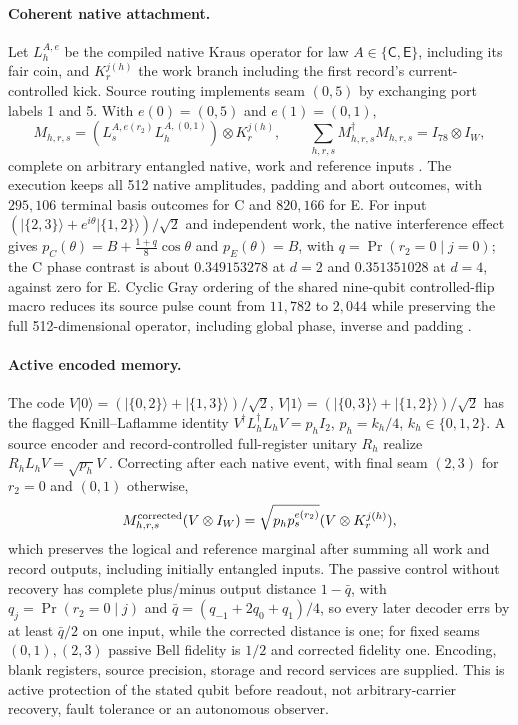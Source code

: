 \documentclass[11pt]{article}
\theoremstyle{definition}
\theoremstyle{remark}
\theoremstyle{plain}
\newcommand{\ket}[1]{\lvert #1\rangle}
\newcommand{\Cn}{\mathsf{C}}
\newcommand{\En}{\mathsf{E}}
\begin{document}
\paragraph{Coherent native attachment.}
Let $L_h^{A,e}$ be the compiled native Kraus operator for law $A\in\{\Cn,\En\}$,
including its fair coin, and $K_r^{j(h)}$ the work branch including the first
record's current-controlled kick. Source routing implements seam $(0,5)$ by
exchanging port labels 1 and 5. With $e(0)=(0,5)$ and $e(1)=(0,1)$,
\[
 M_{h,r,s}=(L_s^{A,e(r_2)}L_h^{A,(0,1)})\otimes K_r^{j(h)},\qquad
 \sum_{h,r,s}M_{h,r,s}^\dagger M_{h,r,s}=I_{78}\otimes I_W,
\]
complete on arbitrary entangled native, work and reference inputs
\cite{csQNATIVE}. The execution keeps all 512 native amplitudes, padding and
abort outcomes, with $295{,}106$ terminal basis outcomes for C and
$820{,}166$ for E. For input $(\ket{\{2,3\}}+e^{i\theta}\ket{\{1,2\}})/\sqrt2$
and independent work, the native interference effect gives
$p_C(\theta)=B+\frac{1+q}{8}\cos\theta$ and $p_E(\theta)=B$, with
$q=\Pr(r_2=0\mid j=0)$; the C phase contrast is about $0.349153278$ at $d=2$
and $0.351351028$ at $d=4$, against zero for E. Cyclic Gray ordering of the
shared nine-qubit controlled-flip macro reduces its source pulse count from
$11{,}782$ to $2{,}044$ while preserving the full 512-dimensional operator,
including global phase, inverse and padding
\cite{pwwelch2014efficient,csQNATIVE,csMEMORY}.

\paragraph{Active encoded memory.}
The code
$V\ket0=(\ket{\{0,2\}}+\ket{\{1,3\}})/\sqrt2$,
$V\ket1=(\ket{\{0,3\}}+\ket{\{1,2\}})/\sqrt2$ has the flagged
Knill--Laflamme identity $V^\dagger L_h^\dagger L_hV=p_hI_2$, $p_h=k_h/4$,
$k_h\in\{0,1,2\}$. A source encoder and record-controlled full-register
unitary $R_h$ realize $R_hL_hV=\sqrt{p_h}V$ \cite{csMEMORY}. Correcting after
each native event, with final seam $(2,3)$ for $r_2=0$ and $(0,1)$ otherwise,
\[
 M^{\rm corrected}_{h,r,s}(V\otimes I_W)
 =\sqrt{p_hp_s^{e(r_2)}}(V\otimes K_r^{j(h)}),
\]
which preserves the logical and reference marginal after summing all work and
record outputs, including initially entangled inputs. The passive control
without recovery has complete plus/minus output distance $1-\bar q$, with
$q_j=\Pr(r_2=0\mid j)$ and $\bar q=(q_{-1}+2q_0+q_1)/4$, so every later
decoder errs by at least $\bar q/2$ on one input, while the corrected
distance is one; for fixed seams $(0,1),(2,3)$ passive Bell fidelity is $1/2$
and corrected fidelity one. Encoding, blank registers, source precision,
storage and record services are supplied. This is active protection of the
stated qubit before readout, not arbitrary-carrier recovery, fault tolerance
or an autonomous observer.
\end{document}
